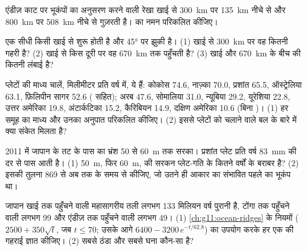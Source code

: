 \begin{exercise}[$\star\star$]\label{exo:g11:subduction-zones:6}
एंडीज़ काट पर भूकंपों का अनुसरण करने वाली रेखा खाई से \qty{300}{km} पर
\qty{135}{km} नीचे से और \qty{800}{km} पर \qty{508}{km} नीचे से
गुज़रती है।  का नमन परिकलित कीजिए।
\end{exercise}

\begin{exercise}[$\star\star$]\label{exo:g11:subduction-zones:7}
एक सीधी  किसी खाई से शुरू होती है और \ang{45} पर झुकी है। (1) खाई से
\qty{300}{km} पर वह कितनी गहरी है? (2) खाई से किस दूरी पर वह
\qty{670}{km} तक पहुँचती है? (3) खाई और
\qty{670}{km} के बीच  की कितनी लंबाई है?
\end{exercise}

\begin{exercise}[$\star\star$]\label{exo:g11:subduction-zones:8}
प्लेटों की माध्य चालें, मिलीमीटर प्रति वर्ष में, ये हैं: कोकोस 74.6, नाज़्का
70.0, प्रशांत 65.5, ऑस्ट्रेलिया 63.1, फ़िलिपीन सागर 52.6 ( सहित); अरब
47.6, सोमालिया 31.0, न्यूबिया 29.2, यूरेशिया 22.8, उत्तर अमेरिका 19.8, अंटार्कटिका
15.2, कैरिबियन 14.9, दक्षिण अमेरिका 10.6 (बिना )। (1) हर समूह का
माध्य और उनका अनुपात परिकलित कीजिए। (2) इससे प्लेटों को चलाने वाले बल के बारे में
क्या संकेत मिलता है?
\end{exercise}

\begin{exercise}[$\star\star$]\label{exo:g11:subduction-zones:9}
2011 में जापान के तट के पास का भ्रंश 50 से \qty{60}{m} तक सरका।
प्रशांत प्लेट प्रति वर्ष \qty{83}{mm} की दर से पास आती है। (1) \qty{50}{m}, फिर \qty{60}{m}, की सरकन
प्लेट-गति के कितने वर्षों के बराबर है? (2) इसकी तुलना 869 से अब तक के समय से कीजिए,
जो उतने ही आकार का संभावित पहले का भूकंप था।
\end{exercise}

\begin{exercise}[$\star\star$]\label{exo:g11:subduction-zones:10}
जापान खाई तक पहुँचने वाली महासागरीय तली लगभग 133 मिलियन वर्ष पुरानी है,
टोंगा तक पहुँचने वाली लगभग 99 और एंडीज़ तक पहुँचने वाली लगभग 49। (1)
\cref{ch:g11:ocean-ridges} के नियमों ($2500 + 350\sqrt{t}$, जब
$t \le 70$; उसके आगे $6400 - 3200\,e^{-t/62.8}$) का उपयोग करके हर एक की गहराई ज्ञात कीजिए। (2)
सबसे ठंडा और सबसे घना  कौन-सा है?
\end{exercise}

